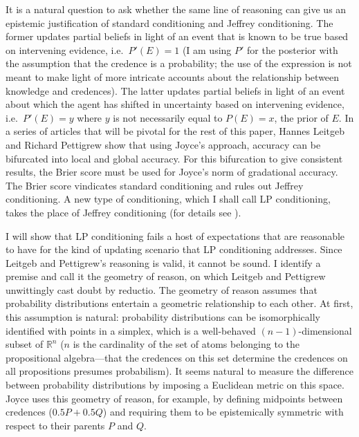 \documentclass[smallextended]{svjour3}       %
\begin{document}
It is a natural question to ask whether the same line of reasoning can
give us an epistemic justification of standard conditioning and
Jeffrey conditioning. The former updates partial beliefs in light of
an event that is known to be true based on intervening evidence, i.e.\
$P'(E)=1$ (I am using $P'$ for the posterior with the assumption that
the credence is a probability; the use of the expression \qnull{known
  to be true} is not meant to make light of more intricate accounts
about the relationship between knowledge and credences). The latter
updates partial beliefs in light of an event about which the agent has
shifted in uncertainty based on intervening evidence, i.e.\ $P'(E)=y$
where $y$ is not necessarily equal to $P(E)=x$, the prior of $E$. In a
series of articles that will be pivotal for the rest of this paper,
Hannes Leitgeb and Richard Pettigrew show that using Joyce's approach,
accuracy can be bifurcated into local and global accuracy. For this
bifurcation to give consistent results, the Brier score must be used
for Joyce's norm of gradational accuracy. The Brier score vindicates
standard conditioning and rules out Jeffrey conditioning. A new type
of conditioning, which I shall call LP conditioning, takes the place
of Jeffrey conditioning (for details see
).

I will show that LP conditioning fails a host of expectations that are
reasonable to have for the kind of updating scenario that LP
conditioning addresses. Since Leitgeb and Pettigrew's reasoning is
valid, it cannot be sound. I identify a premise and call it the
geometry of reason, on which Leitgeb and Pettigrew unwittingly cast
doubt by reductio. The geometry of reason assumes that probability
distributions entertain a geometric relationship to each other. At
first, this assumption is natural: probability distributions can be
isomorphically identified with points in a simplex, which is a
well-behaved $(n-1)$-dimensional subset of $\mathbb{R}^{n}$ ($n$ is
the cardinality of the set of atoms belonging to the propositional
algebra---that the credences on this set determine the credences on
all propositions presumes probabilism). It seems natural to measure
the difference between probability distributions by imposing a
Euclidean metric on this space. Joyce uses this geometry of reason,
for example, by defining midpoints between credences ($0.5P+0.5Q$) and
requiring them to be epistemically symmetric with respect to their
parents $P$ and $Q$.
\end{document}
